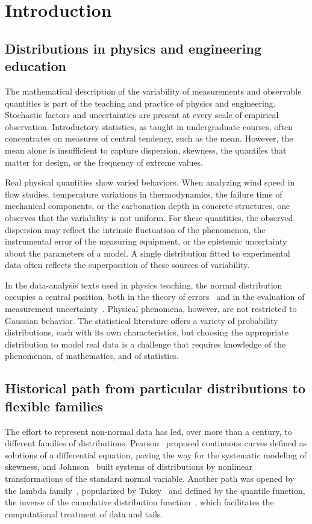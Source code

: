 \section{Introduction}\label{sec:introducao}

\subsection{Distributions in physics and engineering education}

The mathematical description of the variability of measurements and observable quantities is part of the teaching and practice of physics and engineering. Stochastic factors and uncertainties are present at every scale of empirical observation. Introductory statistics, as taught in undergraduate courses, often concentrates on measures of central tendency, such as the mean. However, the mean alone is insufficient to capture dispersion, skewness, the quantiles that matter for design, or the frequency of extreme values.

Real physical quantities show varied behaviors. When analyzing wind speed in flow studies, temperature variations in thermodynamics, the failure time of mechanical components, or the carbonation depth in concrete structures, one observes that the variability is not uniform. For these quantities, the observed dispersion may reflect the intrinsic fluctuation of the phenomenon, the instrumental error of the measuring equipment, or the epistemic uncertainty about the parameters of a model. A single distribution fitted to experimental data often reflects the superposition of these sources of variability.

In the data-analysis texts used in physics teaching, the normal distribution occupies a central position, both in the theory of errors~\cite{taylor1997} and in the evaluation of measurement uncertainty~\cite{gum2008}. Physical phenomena, however, are not restricted to Gaussian behavior. The statistical literature offers a variety of probability distributions, each with its own characteristics, but choosing the appropriate distribution to model real data is a challenge that requires knowledge of the phenomenon, of mathematics, and of statistics.

\subsection{Historical path from particular distributions to flexible families}

The effort to represent non-normal data has led, over more than a century, to different families of distributions. Pearson~\cite{elderton1969} proposed continuous curves defined as solutions of a differential equation, paving the way for the systematic modeling of skewness, and Johnson~\cite{johnson1949} built systems of distributions by nonlinear transformations of the standard normal variable. Another path was opened by the lambda family~\cite{hastings1947}, popularized by Tukey~\cite{tukey1960} and defined by the quantile function, the inverse of the cumulative distribution function~\cite{gilchrist2000}, which facilitates the computational treatment of data and tails.

